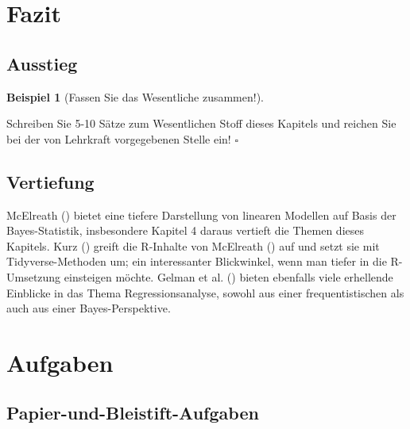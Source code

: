 \documentclass[
  ngerman,
  letterpaper,
  twoside,
  open=any]{scrbook}
\theoremstyle{definition}
\newtheorem{example}{Beispiel}[chapter]
\theoremstyle{plain}
\theoremstyle{definition}
\theoremstyle{definition}
\theoremstyle{definition}
\newtheorem{example}{Beispiel}[chapter]
\theoremstyle{definition}
\theoremstyle{remark}
\begin{document}
\section{Fazit}\label{fazit-3}

\subsection{Ausstieg}\label{ausstieg}

\begin{example}[Fassen Sie das Wesentliche
zusammen!]\protect\hypertarget{exm-ausstieg-post}{}\label{exm-ausstieg-post}

Schreiben Sie 5-10 Sätze zum Wesentlichen Stoff dieses Kapitels und
reichen Sie bei der von Lehrkraft vorgegebenen Stelle ein! \(\square\)

\end{example}

\subsection{Vertiefung}\label{vertiefung-3}

McElreath () bietet eine tiefere
Darstellung von linearen Modellen auf Basis der Bayes-Statistik,
insbesondere Kapitel 4 daraus vertieft die Themen dieses Kapitels. Kurz
() greift die R-Inhalte von McElreath
() auf und setzt sie mit
Tidyverse-Methoden um; ein interessanter Blickwinkel, wenn man tiefer in
die R-Umsetzung einsteigen möchte. Gelman et al.
() bieten ebenfalls viele erhellende
Einblicke in das Thema Regressionsanalyse, sowohl aus einer
frequentistischen als auch aus einer Bayes-Perspektive.

\section{Aufgaben}\label{aufgaben-8}

\subsection{Papier-und-Bleistift-Aufgaben}\label{papier-und-bleistift-aufgaben-3}
\end{document}
